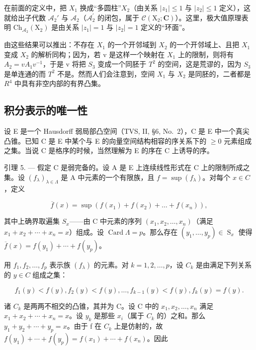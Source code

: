 在前面的定义中，把 \(X_1\) 换成“多圆柱”\(X_2\)（由关系 \(|z_1| \leqslant 1\) 与 \(|z_2| \leqslant 1\) 定义），这就给出子代数 \(\mathscr{A}_2'\) 与 \(\mathscr{A}_2\)（\(\mathcal{A}_2^{\prime}\) 的闭包，属于 \(\mathcal{C}(\mathrm{X}_2; \mathbf{C})\)）。这里，极大值原理表明 \(\mathrm{Ch}_{\mathcal{A}_2}(\mathrm{X}_2)\) 是由关系 \(|z_1| = 1\) 与 \(|z_2| = 1\) 定义的“环面”。

由这些结果可以推出：不存在 \(X_{1}\) 的一个开邻域到 \(X_{2}\) 的一个开邻域上、且把 \(X_{1}\) 变成 \(X_{2}\) 的解析同构；因为，若 v 是这样一个映射在 \(X_{1}\) 上的限制，则将有 \(A_{2}=vA_{1}v^{-1}\)，于是 v 将把 \(S_{3}\) 变成一个同胚于 \(T^{2}\) 的空间，这是荒谬的，因为 \(S_{3}\) 是单连通的而 \(T^{2}\) 不是。然而人们会注意到，空间 \(X_{1}\) 与 \(X_{2}\) 是同胚的，二者都是 \(R^{4}\) 中具有非空内部的有界凸集。

\subsection{积分表示的唯一性}

设 E 是一个 Hausdorff 弱局部凸空间（TVS, II, §6, No.~2），C 是 E 中一个真尖凸锥。已知 C 是 E 中某个与 E 的向量空间结构相容的序关系下的 \(\geqslant0\) 元素组成之集。当说 C 是格序的时候，当然理解为 E 的序在 C 上诱导的序。

引理 5. --- 假定 C 是弱完备的。设 A 是 E 上连续线性形式在 C 上的限制所成之集。设 \((f_{\lambda})_{\lambda \in \Lambda}\) 是 A 中元素的一个有限族，且 \(f = \sup(f_{\lambda})\)。对每个 \(x \in C\)，定义

\[
\overline {{{f}}} (x) = \sup \left(f (x _ {1}) + f (x _ {2}) + \dots + f (x _ {n})\right),
\]

其中上确界取遍集 \(S_{x}\)——由 C 中元素的序列 \((x_{1}, x_{2}, \ldots, x_{n})\)（满足 \(x_{1} + x_{2} + \cdots + x_{n} = x\)）组成。设 \(\operatorname{Card}\Lambda = p\)。那么存在 \((y_{1}, \ldots, y_{p}) \in \operatorname{S}_{x}\) 使得 \(\overline{f}(x) = f(y_{1}) + \cdots + f(y_{p})\)。

用 \(f_1, f_2, \ldots, f_p\) 表示族 \((f_\lambda)\) 的元素。对 \(k = 1, 2, \ldots, p\)，设 \(C_k\) 是由满足下列关系的 \(y \in C\) 组成之集：

\[
f _ {1} (y) <   f (y), f _ {2} (y) <   f (y), \dots , f _ {k - 1} (y) <   f (y), f _ {k} (y) = f (y).
\]

诸 \(C_{k}\) 是两两不相交的凸锥，其并为 C。设 C 中的 \(x_{1}, x_{2}, \ldots, x_{n}\) 满足 \(x_{1} + x_{2} + \cdots + x_{n} = x\)。设 \(y_{k}\) 是那些 \(x_{i}\)（属于 \(C_{k}\) 的）之和。那么 \(y_{1} + y_{2} + \cdots + y_{p} = x\)。由于 f 在 \(C_{k}\) 上是仿射的，故 \(f(y_{1}) + \cdots + f(y_{p}) = f(x_{1}) + \cdots + f(x_{n})\)。因此

